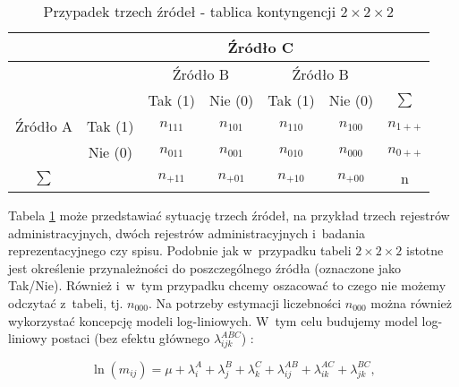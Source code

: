 \documentclass[12pt,a4paper]{article}
\begin{document}
\begin{table}[ht]
\centering
\caption{Przypadek trzech źródeł - tablica kontyngencji $2\times 2\times 2$}\label{tab2}
\begin{tabular}{l|llllll}
\hline
\multicolumn{1}{c|}{} & \multicolumn{1}{c}{} & \multicolumn{4}{c}{Źródło C} & \multicolumn{1}{c}{} \\ 
\hline
\multicolumn{1}{c|}{} & \multicolumn{1}{c}{} & \multicolumn{2}{c}{Źródło B} & \multicolumn{2}{c}{Źródło B} & \multicolumn{1}{c}{} \\ 
\hline
\multicolumn{1}{c|}{} & \multicolumn{1}{c}{} & \multicolumn{1}{c}{Tak (1)} & \multicolumn{1}{c}{Nie (0)} & \multicolumn{1}{c}{Tak (1)} & \multicolumn{1}{c}{Nie (0)} & \multicolumn{1}{c}{$\sum$} \\ 
\multicolumn{1}{c|}{Źródło A} & \multicolumn{1}{c}{Tak (1)} & \multicolumn{1}{c}{$n_{111}$} & \multicolumn{1}{c}{$n_{101}$} & \multicolumn{1}{c}{$n_{110}$} & \multicolumn{1}{c}{$n_{100}$} & \multicolumn{1}{c}{$n_{1++}$} \\ 
\multicolumn{1}{c|}{} & \multicolumn{1}{c}{Nie (0)} & \multicolumn{1}{c}{$n_{011}$} & \multicolumn{1}{c}{$n_{001}$} & \multicolumn{1}{c}{$n_{010}$} & \multicolumn{1}{c}{$n_{000}$} & \multicolumn{1}{c}{$n_{0++}$} \\ 
\hline
\multicolumn{1}{c|}{$\sum$} & \multicolumn{1}{c}{} & \multicolumn{1}{c}{$n_{+11}$} & \multicolumn{1}{c}{$n_{+01}$} & \multicolumn{1}{c}{$n_{+10}$} & \multicolumn{1}{c}{$n_{+00}$} & \multicolumn{1}{c}{n} \\ 
\hline
\end{tabular}
\end{table}

Tabela \ref{tab2} może przedstawiać sytuację trzech źródeł, na przykład trzech rejestrów administracyjnych, dwóch rejestrów administracyjnych i~badania reprezentacyjnego czy spisu. Podobnie jak w~przypadku tabeli $2\times 2 \times 2$ istotne jest określenie przynależności do poszczególnego źródła (oznaczone jako Tak/Nie). Również i~w~tym przypadku chcemy oszacować to czego nie możemy odczytać z~tabeli, tj.  $n_{000}$. Na potrzeby estymacji liczebności $n_{000}$ można również wykorzystać koncepcję modeli log-liniowych. W~tym celu budujemy model log-liniowy postaci (bez efektu głównego $\lambda_{ijk}^{ABC}$) :

\begin{equation}
\ln \left(m_{ij}\right)=\mu +\lambda^{A}_{i}+\lambda^{B}_{j}+\lambda^{C}_{k}+\lambda^{AB}_{ij}+\lambda^{AC}_{ik}+\lambda^{BC}_{jk},
\end{equation}
\end{document}
